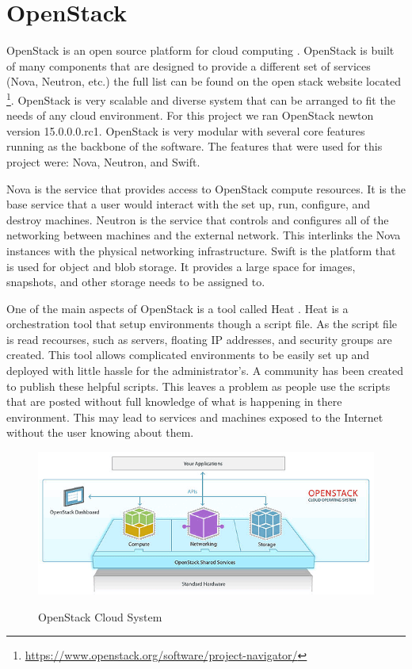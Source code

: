 \documentclass[12pt]{article}
\begin{document}
\section{OpenStack}
OpenStack is an open source platform for cloud computing \cite{OpenStack}. OpenStack is built of many components that are designed to provide a different set of services (Nova, Neutron, etc.) the full list can be found on the open stack website located \footnote{ \href{https://www.openstack.org/software/project-navigator/}{https://www.openstack.org/software/project-navigator/}}. OpenStack is very scalable and diverse system that can be arranged to fit the needs of any cloud environment. For this project we ran OpenStack newton version 15.0.0.0.rc1. OpenStack is very modular with several core features running as the backbone of the software. The features that were used for this project were: Nova, Neutron, and Swift.

Nova is the service that provides access to OpenStack compute resources. It is the base service that a user would interact with the set up, run, configure, and destroy machines. Neutron is the service that controls and configures all of the networking between machines and the external network. This interlinks the Nova instances with the physical networking infrastructure.  Swift is the platform that is used for object and blob storage. It provides a large space for images, snapshots, and other storage needs to be assigned to.

One of the main aspects of OpenStack is a tool called Heat \cite{HeatOS}. Heat is a orchestration tool that setup environments though a script file. As the script file is read recourses, such as servers, floating IP addresses, and security groups are created. This tool allows complicated environments to be easily set up and deployed with little hassle for the administrator's. A community has been created to publish these helpful scripts. This leaves a problem as people use the scripts that are posted without full knowledge of what is happening in there environment. This may lead to services and machines exposed to the Internet without the user knowing about them.
\begin{figure}[H]
    \centering
    \includegraphics[scale=.6]{./pic/openstack-sm.png}
    \label{fig:OpenStack}
    \caption{OpenStack Cloud System}
\end{figure}
\end{document}
